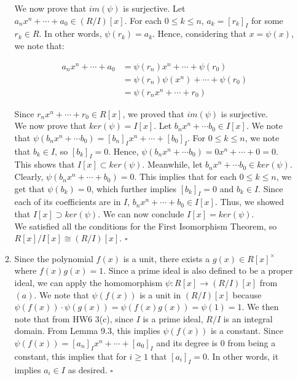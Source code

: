 \documentclass{article}
\begin{document}
\begin{enumerate}
\begin{enumerate}
    We now prove that $im(\psi)$ is surjective. Let $a_nx^n + \cdots + a_0 \in (R/I)[x]$. For each $0 \leq k \leq n$, $a_k = [r_k]_I$ for some $r_k \in R$. In other words, $\psi(r_k) = a_k$. Hence, considering that $x = \psi(x)$, we note that: 

    \begin{align*}
        a_nx^n + \cdots + a_0 &= \psi(r_n)x^n + \cdots + \psi(r_0) \\
        &= \psi(r_n)\psi(x^n) + \cdots + \psi(r_0)\\
        &= \psi(r_nx^n + \cdots + r_0)
    \end{align*}

    Since $r_nx^n + \cdots + r_0 \in R[x]$, we proved that $im(\psi)$ is surjective. \\

    We now prove that $ker(\psi) = I[x]$. Let $b_nx^n + \cdots b_0 \in I[x]$. We note that $\psi(b_nx^n + \cdots b_0) = [b_n]_Ix^n + \cdots + [b_0]_I$. For $0 \leq k \leq n$, we note that $b_k \in I$, so $[b_k]_I = 0$. Hence, $\psi(b_nx^n + \cdots b_0) = 0x^n + \cdots + 0 = 0$. This shows that $I[x] \subset ker(\psi)$. Meanwhile, let $b_nx^n + \cdots b_0 \in ker(\psi)$. Clearly, $\psi(b_nx^n + \cdots + b_0) = 0$. This implies that for each $0 \leq k \leq n$, we get that $\psi(b_k) = 0$, which further implies $[b_k]_I = 0$ and $b_k \in I$. Since each of its coefficients are in $I$, $b_nx^n + \cdots + b_0 \in I[x]$. Thus, we showed that $I[x] \supset ker(\psi)$. We can now conclude $I[x] = ker(\psi)$. \\

    We satisfied all the conditions for the First Isomorphism Theorem, so $R[x]/I[x] \cong (R/I)[x]$. \hfill $\square$  \\

    \item 
    Since the polynomial $f(x)$ is a unit, there exists a $g(x) \in R[x]^{\times}$ where $f(x)g(x) = 1$. Since a prime ideal is also defined to be a proper ideal, we can apply the homomorphism $\psi:R[x] \rightarrow (R/I)[x]$ from $(a)$. We note that $\psi(f(x))$ is a unit in $(R/I)[x]$ because $\psi(f(x))\cdot \psi(g(x)) = \psi(f(x)g(x)) = \psi(1) = 1$. We then note that from HW6 3(c), since $I$ is a prime ideal, $R/I$ is an integral domain. From Lemma 9.3, this implies $\psi(f(x))$ is a constant. Since $\psi(f(x)) = [a_n]_Ix^n + \cdots + [a_0]_I$ and its degree is $0$ from being a constant, this implies that for $i \geq 1$ that $[a_i]_I = 0$. In other words, it implies $a_i \in I$ as desired. \hfill $\square$ \\


\end{enumerate}
\end{enumerate}
\end{document}
